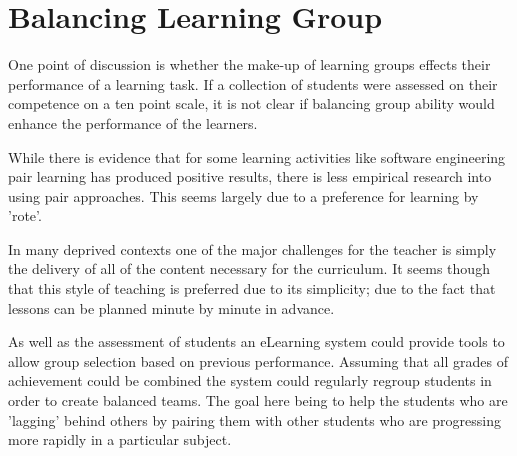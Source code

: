 \section{Balancing Learning Group}

One point of discussion is whether the make-up of learning groups effects their
performance of a learning task. If a collection of students were assessed on
their competence on a ten point scale, it is not clear if balancing group 
ability would enhance the performance of the learners.

While there is evidence that for some learning activities like software 
engineering pair learning has produced positive results, there is less empirical
research into using pair approaches. This seems largely due to a preference for
learning by 'rote'. 

In many deprived contexts one of the major challenges for the teacher is simply
the delivery of all of the content necessary for the curriculum. It seems
though that this style of teaching is preferred due to its simplicity; due to
the fact that lessons can be planned minute by minute in advance.

As well as the assessment of students an eLearning system could provide tools to
allow group selection based on previous performance. Assuming that all grades
of achievement could be combined the system could regularly regroup students
in order to create balanced teams. The goal here being to help the students who
are 'lagging' behind others by pairing them with other students who are 
progressing more rapidly in a particular subject. 

